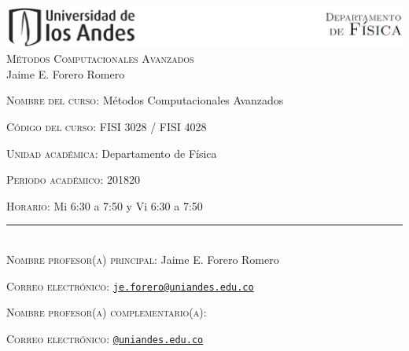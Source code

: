 \documentclass[letterpaper,10pt,onecolumn]{article}
\begin{document}
\begin{center}

\includegraphics[width=490pt]{header.png}\\[0.5cm]

\textsc{\LARGE M\'etodos Computacionales Avanzados}\\[0.1cm]

\large Jaime E. Forero Romero\\[0.5cm]

\end{center}

\large \noindent\textsc{Nombre del curso:}  M\'etodos Computacionales
Avanzados%
  
\noindent\textsc{C\'odigo del curso:} FISI 3028 / FISI 4028 %

\noindent\textsc{Unidad acad\'emica:} Departamento de F\'isica

\noindent\textsc{Periodo acad\'emico:} 201820 %

\noindent\textsc{Horario:} Mi 6:30 a 7:50 y Vi 6:30 a 7:50 %

\noindent\rule{\textwidth}{1pt}\\[-0.3cm]

\normalsize \noindent\textsc{Nombre profesor(a) principal:} Jaime
E. Forero Romero%

\noindent\textsc{Correo electr\'onico:}
\href{mailto:je.forero@uniandes.edu.co}{\nolinkurl{je.forero@uniandes.edu.co}}


\noindent\textsc{Nombre profesor(a) complementario(a):} %

\noindent\textsc{Correo electr\'onico:}
\href{mailto:@uniandes.edu.co}{\nolinkurl{@uniandes.edu.co}}
\end{document}
